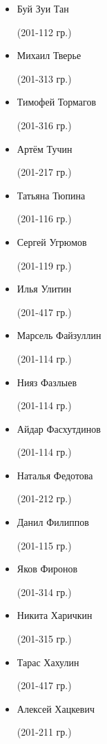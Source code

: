 \begin{multicols}{2}
\begin{small}
\begin{itemize}[leftmargin=0.5em]
	\item[] Буй Зуи Тан\begin{tiny} (201-112 гр.)\end{tiny}
	\item[] Михаил Тверье\begin{tiny} (201-313 гр.)\end{tiny} %
	\item[] Тимофей Тормагов\begin{tiny} (201-316 гр.)\end{tiny} %
	\item[] Артём Тучин\begin{tiny} (201-217 гр.)\end{tiny} %
	\item[] Татьяна Тюпина\begin{tiny} (201-116 гр.)\end{tiny}

	\item[] Сергей Угрюмов\begin{tiny} (201-119 гр.)\end{tiny}
	\item[] Илья Улитин\begin{tiny} (201-417 гр.)\end{tiny} %

	\item[] Марсель Файзуллин\begin{tiny} (201-114 гр.)\end{tiny}
	\item[] Нияз Фазлыев\begin{tiny} (201-114 гр.)\end{tiny} %
	\item[] Айдар Фасхутдинов\begin{tiny} (201-114 гр.)\end{tiny} %
	\item[] Наталья Федотова\begin{tiny} (201-212 гр.)\end{tiny}
	\item[] Данил Филиппов\begin{tiny} (201-115 гр.)\end{tiny}
	\item[] Яков Фиронов\begin{tiny} (201-314 гр.)\end{tiny} %

	\item[] Никита Харичкин\begin{tiny} (201-315 гр.)\end{tiny} %
	\item[] Тарас Хахулин\begin{tiny} (201-417 гр.)\end{tiny} %
	\item[] Алексей Хацкевич\begin{tiny} (201-211 гр.)\end{tiny}


\end{itemize}
\end{small}
\end{multicols}
